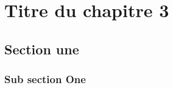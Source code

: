 \chapter{Titre du chapitre 3}
\label{chap:3}

\section{Section une}
\label{chap:sectionone}

\subsection{Sub section One}
